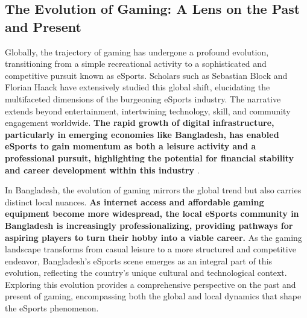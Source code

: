 \documentclass[manuscript,screen,review,anonymous]{acmart}
\begin{document}
\subsection{The Evolution of Gaming: A Lens on the Past and Present}

Globally, the trajectory of gaming has undergone a profound evolution, transitioning from a simple recreational activity to a sophisticated and competitive pursuit known as eSports. Scholars such as Sebastian Block and Florian Haack \cite{a1} have extensively studied this global shift, elucidating the multifaceted dimensions of the burgeoning eSports industry. The narrative extends beyond entertainment, intertwining technology, skill, and community engagement worldwide. \textbf{The rapid growth of digital infrastructure, particularly in emerging economies like Bangladesh, has enabled eSports to gain momentum as both a leisure activity and a professional pursuit, highlighting the potential for financial stability and career development within this industry} \cite{Szillat2020Introduction}.

In Bangladesh, the evolution of gaming mirrors the global trend but also carries distinct local nuances. \textbf{As internet access and affordable gaming equipment become more widespread, the local eSports community in Bangladesh is increasingly professionalizing, providing pathways for aspiring players to turn their hobby into a viable career.} As the gaming landscape transforms from casual leisure to a more structured and competitive endeavor, Bangladesh's eSports scene emerges as an integral part of this evolution, reflecting the country's unique cultural and technological context. Exploring this evolution provides a comprehensive perspective on the past and present of gaming, encompassing both the global and local dynamics that shape the eSports phenomenon.
\end{document}
